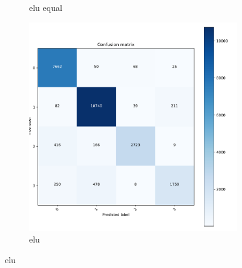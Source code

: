 \documentclass[aspectratio=1610, professionalfonts, 9pt]{beamer}
\begin{document}
\begin{frame}
\begin{figure}[H]
\begin{subfigure}{0.3\textwidth}
            \caption{elu equal}%
        \end{subfigure}%
        \hfill%
        \begin{subfigure}{0.3\textwidth}%
            \includegraphics[width=1.2\linewidth]{images/confusion_matrix_elu.pdf}%
            \caption{elu}%
        \end{subfigure}%
    \end{figure}%
\end{frame}
\end{document}
